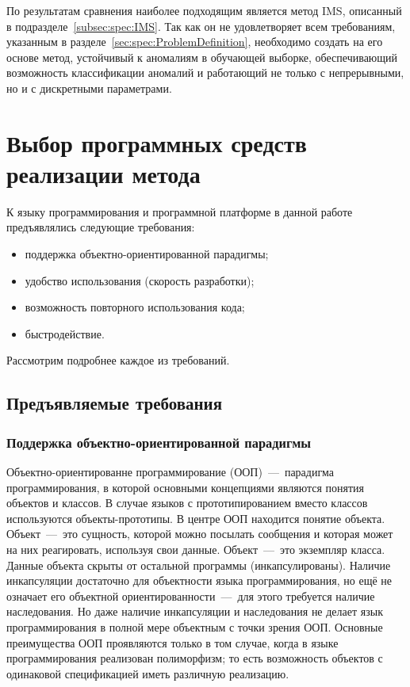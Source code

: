 По результатам сравнения наиболее подходящим является метод IMS, описанный в подразделе~\ref{subsec:spec:IMS}. Так как он не удовлетворяет всем требованиям, указанным в разделе~\ref{sec:spec:ProblemDefinition}, необходимо создать на его основе метод, устойчивый к аномалиям в обучающей выборке, обеспечивающий возможность классификации аномалий и работающий не только с непрерывными, но и с дискретными параметрами.



\section{Выбор программных средств реализации метода}

К языку программирования и программной платформе в данной работе предъявлялись следующие требования:
\begin{itemize}
	\item поддержка объектно-ориентированной парадигмы;
	\item удобство использования (скорость разработки);
	\item возможность повторного использования кода;
	\item быстродействие.
\end{itemize}

Рассмотрим подробнее каждое из требований.

\subsection{Предъявляемые требования}
\subsubsection{Поддержка объектно-ориентированной парадигмы}
Объектно-ориентированне программирование (ООП)~---~парадигма программирования, в которой основными концепциями являются понятия объектов и классов. В случае языков с прототипированием вместо классов используются объекты-прототипы. В центре ООП находится понятие объекта. Объект~---~это сущность, которой можно посылать сообщения и которая может на них реагировать, используя свои данные. Объект~---~это экземпляр класса. Данные объекта скрыты от остальной программы (инкапсулированы).
Наличие инкапсуляции достаточно для объектности языка программирования, но ещё не означает его объектной ориентированности~---~для этого требуется наличие наследования.
Но даже наличие инкапсуляции и наследования не делает язык программирования в полной мере объектным с точки зрения ООП. Основные преимущества ООП проявляются только в том случае, когда в языке программирования реализован полиморфизм; то есть возможность объектов с одинаковой спецификацией иметь различную реализацию.


